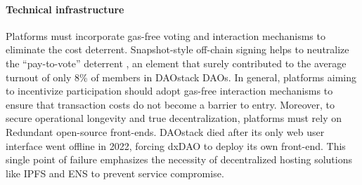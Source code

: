 \documentclass[10pt,lineno]{wlpeerj}
\begin{document}

\paragraph{Technical infrastructure}

Platforms must incorporate gas-free voting and interaction mechanisms to eliminate the cost deterrent. Snapshot-style off-chain signing helps to neutralize the ``pay-to-vote'' deterrent \citep{saldivar_blockchain_2023}, an element that surely contributed to the average turnout of only 8\% of members in DAOstack DAOs. In general, platforms aiming to incentivize participation should adopt gas-free interaction mechanisms to ensure that transaction costs do not become a barrier to entry. 
Moreover, to secure operational longevity and true decentralization, platforms must rely on Redundant open-source front-ends. DAOstack died after its only web user interface went offline in 2022, forcing dxDAO to deploy its own front-end. This single point of failure emphasizes the necessity of decentralized hosting solutions like IPFS and ENS to prevent service compromise.

  
  
\end{document}
